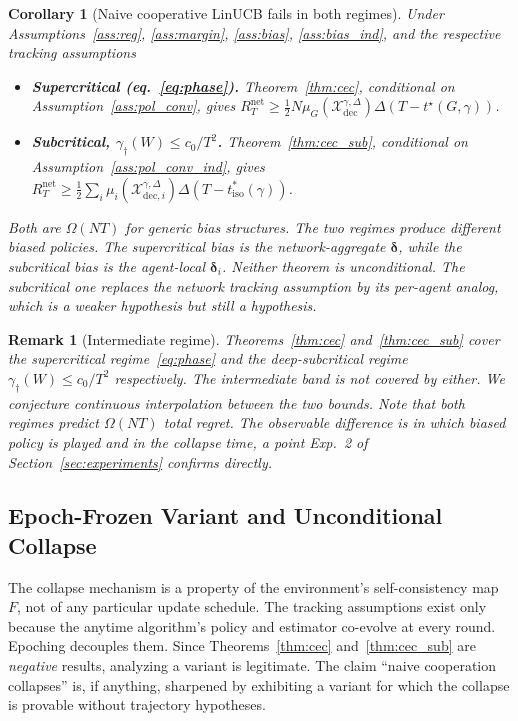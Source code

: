 \documentclass[11pt]{article}
\newtheorem{corollary}[theorem]{Corollary}
\newtheorem{remark}[theorem]{Remark}
\begin{document}
\begin{corollary}[Naive cooperative LinUCB fails in both regimes]
\label{cor:both}
Under Assumptions~\ref{ass:reg}, \ref{ass:margin}, \ref{ass:bias},
\ref{ass:bias_ind}, and the respective tracking assumptions \begin{itemize}
\item \textbf{Supercritical (eq.~\eqref{eq:phase}).}
Theorem~\ref{thm:cec}, conditional on Assumption~\ref{ass:pol_conv},
gives
$R_T^{\mathrm{net}}\geq \tfrac12 N\mu_G(\mathcal{X}_{\mathrm{dec}}^{\gamma,\Delta})
\Delta(T-t^\star(G,\gamma))$.
\item \textbf{Subcritical, $\gamma_\dagger(W)\leq c_0/T^2$.}
Theorem~\ref{thm:cec_sub}, conditional on
Assumption~\ref{ass:pol_conv_ind}, gives
$R_T^{\mathrm{net}}\geq\tfrac12\sum_i\mu_i(\mathcal{X}_{\mathrm{dec},i}^{\gamma,\Delta})
\Delta(T-t_{\mathrm{iso}}^*(\gamma))$.
\end{itemize}
Both are $\Omega(NT)$ for generic bias structures.  The two regimes
produce different biased policies. The supercritical bias is the
network-aggregate $\bm{\delta}$, while the subcritical bias is the
agent-local $\bm{\delta}_i$.  Neither theorem is unconditional. The
subcritical one replaces the network tracking assumption by its
per-agent analog, which is a weaker hypothesis but still a hypothesis.
\end{corollary}

\begin{remark}[Intermediate regime]
Theorems~\ref{thm:cec} and~\ref{thm:cec_sub} cover the supercritical
regime~\eqref{eq:phase} and the deep-subcritical regime
$\gamma_\dagger(W)\leq c_0/T^2$ respectively.  The intermediate band is
not covered by either. We conjecture continuous interpolation between
the two bounds.  Note that both regimes predict $\Omega(NT)$
\emph{total} regret. The observable difference is in which biased
policy is played and in the collapse time, a point Exp.~2 of
Section~\ref{sec:experiments} confirms directly.
\end{remark}

\subsection{Epoch-Frozen Variant and Unconditional Collapse}
\label{sec:epoch}

The collapse mechanism is a property of the environment's
self-consistency map $F$, not of any particular update schedule. The
tracking assumptions exist only because the anytime algorithm's policy
and estimator co-evolve at every round.  Epoching decouples them.
Since Theorems~\ref{thm:cec} and~\ref{thm:cec_sub} are \emph{negative}
results, analyzing a variant is legitimate. The claim ``naive
cooperation collapses'' is, if anything, sharpened by exhibiting a
variant for which the collapse is provable without trajectory
hypotheses.
\end{document}
